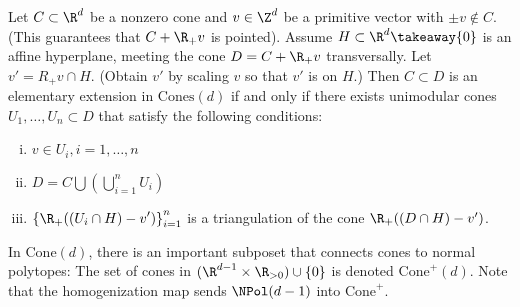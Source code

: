 \documentclass{TC}
\begin{document}
\begin{lemma}
Let $C \subset \R^d$ be a nonzero cone and $v \in \Z^d$ be a primitive vector with $\pm v \notin C$. (This guarantees that $C+\R_+v$ is pointed). Assume $H \subset \R^d \takeaway \{0\}$ is an affine hyperplane, meeting the cone $D = C + \R_+v$ transversally. Let $v' = R_+v \cap H$. (Obtain $v'$ by scaling $v$ so that $v'$ is on $H$.) Then $C \subset D$ is an elementary extension in $\mathrm{Cones}(d)$ if and only if there exists unimodular cones $U_1,\ldots,U_n \subset D$ that satisfy the following conditions:
\begin{enumerate}[(i)]
\item $v \in U_i , i=1,\ldots,n$
\item $D = C \displaystyle\bigcup\left(\bigcup_{i=1}^n U_i\right)$
\item $\displaystyle\left\{\R_+((U_i \cap H) - v')\right\}_{i=1}^n$ is a triangulation of the cone $\R_+((D \cap H) - v')$. 
\end{enumerate}


\end{lemma}
 
In $\mathrm{Cone}(d)$, there is an important subposet that connects cones to normal polytopes: The set of cones in $(\R^{d-1} \times \R_{>0}) \cup \{0\}$ is denoted $\mathrm{Cone}^+(d)$. Note that the homogenization map sends $\NPol(d-1)$ into $\mathrm{Cone}^+$. 
\end{document}

